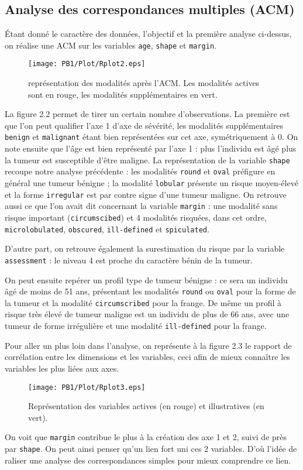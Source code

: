 \documentclass[a4paper]{report}
\begin{document}
  \subsection{Analyse des correspondances multiples (ACM)}
  Étant donné le caractère des données, l'objectif et la première analyse ci-dessus, on réalise une ACM sur les variables \verb|age|, \verb|shape| et \verb|margin|. 
  
  \begin{figure}[!ht]
	\centering
     	\texttt{[image: PB1/Plot/Rplot2.eps]}

	\caption{représentation des modalités après l'ACM. Les modalités actives sont en rouge, les modalités supplémentaires en vert.}
\end{figure}
   
La figure 2.2 permet de tirer un certain nombre d'observations. La première est que l'on peut qualifier l'axe 1 d'axe de sévérité, les modalités supplémentaires \verb|benign| et \verb|malignant| étant bien représentées sur cet axe, symétriquement à 0. On note ensuite que l'âge est bien représenté par l'axe 1 : plus l'individu est âgé plus la tumeur est susceptible d'être maligne. La représentation de la variable \verb|shape| recoupe notre analyse précédente : les modalités \verb|round| et \verb|oval| préfigure en général une tumeur bénigne ; la modalité \verb|lobular| présente un risque moyen-élevé et la forme \verb|irregular| est par contre signe d'une tumeur maligne. On retrouve aussi ce que l'on avait dit concernant la variable \verb|margin| : une modalité sans risque important (\verb|circumscibed|) et 4 modalités risquées, dans cet ordre, \verb|microlobulated|, \verb|obscured|, \verb|ill-defined| et \verb|spiculated|.

D'autre part, on retrouve également la surestimation du risque par la variable \verb|assessment| : le niveau 4 est proche du caractère bénin de la tumeur.

On peut ensuite repérer un profil type de tumeur bénigne : ce sera un individu âgé de moins de 51 ans, présentant les modalités \verb|round| ou \verb|oval| pour la forme de la tumeur et la modalité \verb|circumscribed| pour la frange.
De même un profil à risque très élevé de tumeur maligne est un individu de plus de 66 ans, avec une tumeur de forme irrégulière et une modalité \verb|ill-defined| pour la frange.
 
 Pour aller un plus loin dans l'analyse, on représente à la figure 2.3 le rapport de corrélation entre les dimensions et les variables, ceci afin de mieux connaître les variables les plus liées aux axes.
 \begin{figure}[!ht]
	\centering
     	\texttt{[image: PB1/Plot/Rplot3.eps]}

	\caption{Représentation des variables actives (en rouge) et illustratives (en vert).}
\end{figure}
On voit que \verb|margin| contribue le plus à la création des axe 1 et 2, suivi de près par \verb|shape|. On peut ainsi penser qu'un lien fort uni ces 2 variables. D'où l'idée de raliser une analyse des correspondances simples pour mieux comprendre ce lien.
\end{document}
